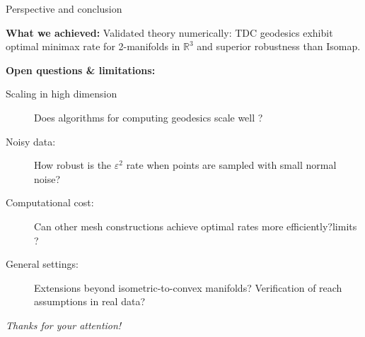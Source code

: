 \documentclass[9pt]{beamer}
\begin{document}
\begin{frame}{Perspective and conclusion}

\textbf{What we achieved:}
Validated theory numerically: TDC geodesics exhibit optimal minimax rate for 2-manifolds in $\mathbb{R}^3$ and superior robustness than Isomap.

\medskip

\textbf{Open questions \& limitations:}

\begin{description}
    \item[Scaling in high dimension] Does algorithms for computing geodesics scale well ?
  \item[Noisy data:] How robust is the $\varepsilon^2$ rate when points are sampled with small normal noise?
  \item[Computational cost:] Can other mesh constructions achieve optimal rates more efficiently?limits ?
  \item[General settings:] Extensions beyond isometric-to-convex manifolds? Verification of reach assumptions in real data?
\end{description}







\end{frame}








\begin{frame}

\centering
\huge
\emph{Thanks for your attention!}
% 
% 


\end{frame}
\end{document}
